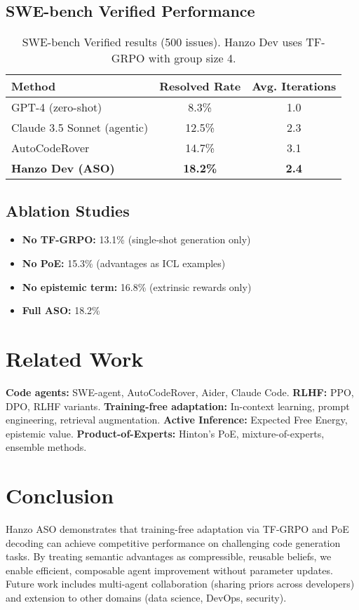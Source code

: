 \documentclass[11pt]{article}
\begin{document}
\subsection{SWE-bench Verified Performance}
\begin{table}[h]
\centering
\begin{tabular}{lcc}
\toprule
Method & Resolved Rate & Avg. Iterations \\
\midrule
GPT-4 (zero-shot) & 8.3\% & 1.0 \\
Claude 3.5 Sonnet (agentic) & 12.5\% & 2.3 \\
AutoCodeRover & 14.7\% & 3.1 \\
\textbf{Hanzo Dev (ASO)} & \textbf{18.2\%} & \textbf{2.4} \\
\bottomrule
\end{tabular}
\caption{SWE-bench Verified results (500 issues). Hanzo Dev uses TF-GRPO with group size 4.}
\end{table}

\subsection{Ablation Studies}
\begin{itemize}[leftmargin=1.1em]
  \item \textbf{No TF-GRPO:} 13.1\% (single-shot generation only)
  \item \textbf{No PoE:} 15.3\% (advantages as ICL examples)
  \item \textbf{No epistemic term:} 16.8\% (extrinsic rewards only)
  \item \textbf{Full ASO:} 18.2\%
\end{itemize}

\section{Related Work}
\textbf{Code agents:} SWE-agent, AutoCodeRover, Aider, Claude Code. \textbf{RLHF:} PPO, DPO, RLHF variants. \textbf{Training-free adaptation:} In-context learning, prompt engineering, retrieval augmentation. \textbf{Active Inference:} Expected Free Energy, epistemic value. \textbf{Product-of-Experts:} Hinton's PoE, mixture-of-experts, ensemble methods.

\section{Conclusion}
Hanzo ASO demonstrates that training-free adaptation via TF-GRPO and PoE decoding can achieve competitive performance on challenging code generation tasks. By treating semantic advantages as compressible, reusable beliefs, we enable efficient, composable agent improvement without parameter updates. Future work includes multi-agent collaboration (sharing priors across developers) and extension to other domains (data science, DevOps, security).
\end{document}
